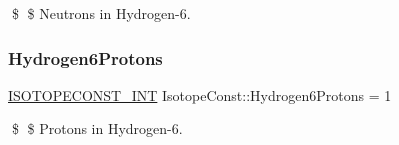 \$ \$ Neutrons in Hydrogen-\/6. \mbox{\label{group___isotope_const-_hydrogen-_h6_ga81f0b2b2103ec98c3fd107dc158bfbbe}} 
\subsubsection{\texorpdfstring{Hydrogen6\+Protons}{Hydrogen6Protons}}
{\footnotesize\ttfamily \mbox{\hyperlink{group___isotope_const-_macros_ga5f18360b3e99483a35c32d789e62621c}{I\+S\+O\+T\+O\+P\+E\+C\+O\+N\+S\+T\+\_\+\+I\+NT}} Isotope\+Const\+::\+Hydrogen6\+Protons = 1}

\$ \$ Protons in Hydrogen-\/6. 